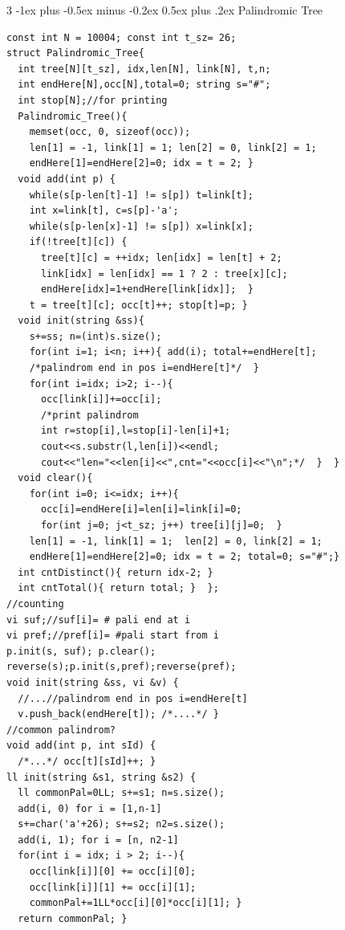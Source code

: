 \documentclass[8pt,a4paper,onesided]{article}
\makeatletter
\renewcommand{\subsection}{\@startsection{subsection}{2}{0mm}
    {-1ex plus -0.5ex minus -0.2ex} %
    {0.5ex plus .2ex}                %
    {\normalfont\large\bfseries}}    %
\makeatother
\begin{document}
\begin{multicols}{3}
\subsection{Palindromic Tree}
\begin{verbatim}
const int N = 10004; const int t_sz= 26;
struct Palindromic_Tree{
  int tree[N][t_sz], idx,len[N], link[N], t,n;
  int endHere[N],occ[N],total=0; string s="#";
  int stop[N];//for printing
  Palindromic_Tree(){
    memset(occ, 0, sizeof(occ));
    len[1] = -1, link[1] = 1; len[2] = 0, link[2] = 1;
    endHere[1]=endHere[2]=0; idx = t = 2; }
  void add(int p) {
    while(s[p-len[t]-1] != s[p]) t=link[t];
    int x=link[t], c=s[p]-'a';
    while(s[p-len[x]-1] != s[p]) x=link[x];        
    if(!tree[t][c]) {
      tree[t][c] = ++idx; len[idx] = len[t] + 2;
      link[idx] = len[idx] == 1 ? 2 : tree[x][c];
      endHere[idx]=1+endHere[link[idx]];  }
    t = tree[t][c]; occ[t]++; stop[t]=p; }
  void init(string &ss){
    s+=ss; n=(int)s.size();
    for(int i=1; i<n; i++){ add(i); total+=endHere[t];
    /*palindrom end in pos i=endHere[t]*/  }
    for(int i=idx; i>2; i--){
      occ[link[i]]+=occ[i];
      /*print palindrom 
      int r=stop[i],l=stop[i]-len[i]+1;
      cout<<s.substr(l,len[i])<<endl;
      cout<<"len="<<len[i]<<",cnt="<<occ[i]<<"\n";*/  }  }
  void clear(){
    for(int i=0; i<=idx; i++){
      occ[i]=endHere[i]=len[i]=link[i]=0;
      for(int j=0; j<t_sz; j++) tree[i][j]=0;  }
    len[1] = -1, link[1] = 1;  len[2] = 0, link[2] = 1;
    endHere[1]=endHere[2]=0; idx = t = 2; total=0; s="#";}
  int cntDistinct(){ return idx-2; }
  int cntTotal(){ return total; }  };
//counting
vi suf;//suf[i]= # pali end at i
vi pref;//pref[i]= #pali start from i
p.init(s, suf); p.clear();
reverse(s);p.init(s,pref);reverse(pref);
void init(string &ss, vi &v) {
  //...//palindrom end in pos i=endHere[t]
  v.push_back(endHere[t]); /*....*/ }
//common palindrom?
void add(int p, int sId) {
  /*...*/ occ[t][sId]++; }
ll init(string &s1, string &s2) {
  ll commonPal=0LL; s+=s1; n=s.size();
  add(i, 0) for i = [1,n-1]
  s+=char('a'+26); s+=s2; n2=s.size();
  add(i, 1); for i = [n, n2-1]
  for(int i = idx; i > 2; i--){
    occ[link[i]][0] += occ[i][0];
    occ[link[i]][1] += occ[i][1];
    commonPal+=1LL*occ[i][0]*occ[i][1]; }
  return commonPal; }
\end{verbatim}

\end{multicols}
\end{document}
